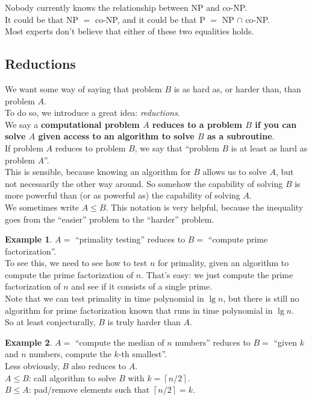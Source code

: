 \documentclass[12pt]{article}
\theoremstyle{plain}
\theoremstyle{definition}
\newtheorem*{ex*}{Example}
\newcommand{\ceil}[1]{\ensuremath{\left\lceil #1 \right\rceil}}
\begin{document}
Nobody currently knows the relationship between NP and co-NP. \\
It could be that NP $=$ co-NP, and it could be that P $=$ NP $\cap$ co-NP. \\
Most experts don't believe that either of these two equalities holds.

\subsection{Reductions}
We want some way of saying that problem $B$ is as hard as, or harder than, than problem $A$. \\
To do so, we introduce a great idea: \emph{reductions}. \\

We say a \textbf{computational problem $A$ reduces to a problem $B$ if you can solve $A$ given access to an algorithm to solve $B$ as a subroutine}. \\

If problem $A$ reduces to problem $B$, we say that ``problem $B$ is at least as hard as problem $A$''. \\
This is sensible, because knowing an algorithm for $B$ allows us to solve $A$, but not necessarily the other way around.
So somehow the capability of solving $B$ is more powerful than (or as powerful as) the capability of solving $A$. \\
We sometimes write $A \leq B$.
This notation is very helpful, because the inequality goes from the ``easier'' problem to the ``harder'' problem.

\begin{ex*}
$A =$ ``primality testing'' reduces to $B =$ ``compute prime factorization''. \\
To see this, we need to see how to test $n$ for primality, given an algorithm to compute the prime factorization of $n$.
That's easy: we just compute the prime factorization of $n$ and see if it consists of a single prime. \\
Note that we can test primality in time polynomial in $\lg{n}$, but there is still no algorithm for prime factorization known that runs in time polynomial in $\lg{n}$. \\
So at least conjecturally, $B$ is truly harder than $A$.
\end{ex*}

\begin{ex*}
$A =$ ``compute the median of $n$ numbers'' reduces to $B =$ ``given $k$ and $n$ numbers, compute the $k$-th smallest''. \\
Less obviously, $B$ also reduces to $A$. \\
$A \leq B$: call algorithm to solve $B$ with $k = \ceil{n/2}$. \\
$B \leq A$: pad/remove elements such that $\ceil{n/2} = k$.
\end{ex*}
\end{document}
